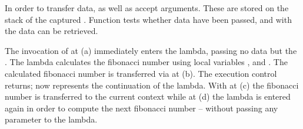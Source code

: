 In order to transfer data, \callcc as well as \resume accept arguments. These are
stored on the stack of the captured \currcont. Function \dataavail tests whether data
have been passed, and with \getdata the data can be retrieved.

The invocation of \callcc at (a) immediately enters the lambda, passing no data
but the \currcont. The lambda calculates the fibonacci number using local
variables ,  and . The calculated fibonacci number is
transferred via \resume at (b). The execution control returns;  now
represents the continuation of the lambda. With \getdata at (c) the fibonacci
number is transferred to the current context while at (d) the lambda is entered
again in order to compute the next fibonacci number -- without passing any
parameter to the lambda.
